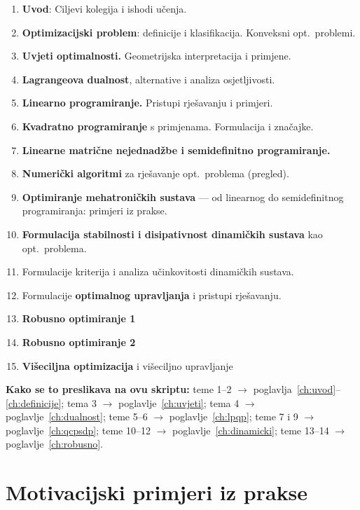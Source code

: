 \begin{enumerate}
  \item \textbf{Uvod}: Ciljevi kolegija i ishodi učenja.
  \item \textbf{Optimizacijski problem}: definicije i klasifikacija. Konveksni
        opt.\ problemi.
  \item \textbf{Uvjeti optimalnosti.} Geometrijska interpretacija i primjene.
  \item \textbf{Lagrangeova dualnost}, alternative i analiza osjetljivosti.
  \item \textbf{Linearno programiranje.} Pristupi rješavanju i primjeri.
  \item \textbf{Kvadratno programiranje} s primjenama. Formulacija i značajke.
  \item \textbf{Linearne matrične nejednadžbe i semidefinitno programiranje.}
  \item \textbf{Numerički algoritmi} za rješavanje opt.\ problema (pregled).
  \item \textbf{Optimiranje mehatroničkih sustava} --- od linearnog do
        semidefinitnog programiranja: primjeri iz prakse.
  \item \textbf{Formulacija stabilnosti i disipativnost dinamičkih sustava} kao
        opt.\ problema.
  \item Formulacije kriterija i analiza učinkovitosti dinamičkih sustava.
  \item Formulacije \textbf{optimalnog upravljanja} i pristupi rješavanju.
  \item \textbf{Robusno optimiranje 1}
  \item \textbf{Robusno optimiranje 2}
  \item \textbf{Višeciljna optimizacija} i višeciljno upravljanje
\end{enumerate}

\textbf{Kako se to preslikava na ovu skriptu:} teme 1--2 $\to$
poglavlja~\ref{ch:uvod}--\ref{ch:definicije}; tema 3 $\to$
poglavlje~\ref{ch:uvjeti}; tema 4 $\to$ poglavlje~\ref{ch:dualnost}; teme 5--6
$\to$ poglavlje~\ref{ch:lpqp}; teme 7 i 9 $\to$ poglavlje~\ref{ch:qcpsdp}; teme
10--12 $\to$ poglavlje~\ref{ch:dinamicki}; teme 13--14 $\to$
poglavlje~\ref{ch:robusno}.

\section{Motivacijski primjeri iz prakse}

